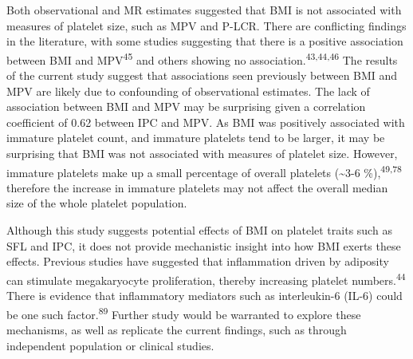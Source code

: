 \documentclass[11pt,twoside]{bristolthesis}
\begin{document}
Both observational and MR estimates suggested that BMI is not associated with measures of platelet size, such as MPV and P-LCR. There are conflicting findings in the literature, with some studies suggesting that there is a positive association between BMI and MPV\textsuperscript{45} and others showing no association.\textsuperscript{43,44,46} The results of the current study suggest that associations seen previously between BMI and MPV are likely due to confounding of observational estimates. The lack of association between BMI and MPV may be surprising given a correlation coefficient of 0.62 between IPC and MPV. As BMI was positively associated with immature platelet count, and immature platelets tend to be larger, it may be surprising that BMI was not associated with measures of platelet size. However, immature platelets make up a small percentage of overall platelets (\textasciitilde3-6 \%),\textsuperscript{49,78} therefore the increase in immature platelets may not affect the overall median size of the whole platelet population.

Although this study suggests potential effects of BMI on platelet traits such as SFL and IPC, it does not provide mechanistic insight into how BMI exerts these effects. Previous studies have suggested that inflammation driven by adiposity can stimulate megakaryocyte proliferation, thereby increasing platelet numbers.\textsuperscript{44} There is evidence that inflammatory mediators such as interleukin-6 (IL-6) could be one such factor.\textsuperscript{89} Further study would be warranted to explore these mechanisms, as well as replicate the current findings, such as through independent population or clinical studies.
\end{document}
